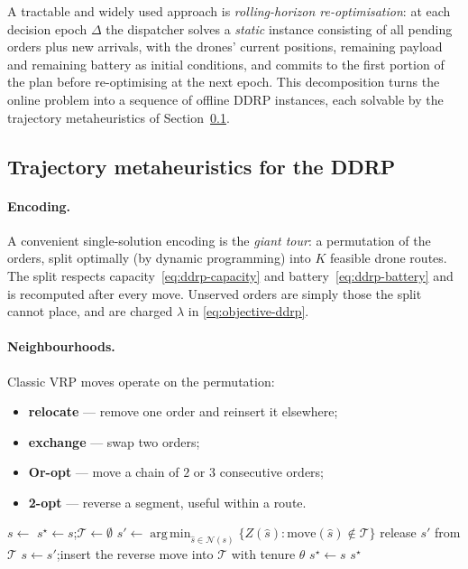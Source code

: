 \documentclass[11pt,a4paper]{article}
\DeclareMathOperator*{\argmin}{arg\,min}
\begin{document}
A tractable and widely used approach is \emph{rolling-horizon
re-optimisation}: at each decision epoch $\Delta$ the dispatcher solves a
\emph{static} instance consisting of all pending orders plus new arrivals, with
the drones' current positions, remaining payload and remaining battery as
initial conditions, and commits to the first portion of the plan before
re-optimising at the next epoch. This decomposition turns the online problem
into a sequence of offline DDRP instances, each solvable by the trajectory
metaheuristics of Section~\ref{sec:ddrp-meta}.

\subsection{Trajectory metaheuristics for the DDRP}
\label{sec:ddrp-meta}

\paragraph{Encoding.}
A convenient single-solution encoding is the \emph{giant tour}: a permutation
of the orders, split optimally (by dynamic programming) into $K$ feasible
drone routes. The split respects capacity~\eqref{eq:ddrp-capacity} and
battery~\eqref{eq:ddrp-battery} and is recomputed after every move. Unserved
orders are simply those the split cannot place, and are charged $\lambda$ in
\eqref{eq:objective-ddrp}.

\paragraph{Neighbourhoods.}
Classic VRP moves operate on the permutation:
\begin{itemize}
  \item \textbf{relocate} --- remove one order and reinsert it elsewhere;
  \item \textbf{exchange} --- swap two orders;
  \item \textbf{Or-opt} --- move a chain of $2$ or $3$ consecutive orders;
  \item \textbf{2-opt} --- reverse a segment, useful within a route.
\end{itemize}

\begin{algorithm}[H]
\caption{Tabu search for the (static) DDRP}
\label{alg:ts-ddrp}
\begin{algorithmic}[1]
\State $s \leftarrow$ 
\State $s^{\star} \leftarrow s$;\quad $\mathcal{T} \leftarrow \emptyset$
  \State $s' \leftarrow \argmin_{\hat{s}\in\mathcal{N}(s)} \{ Z(\hat{s}) : \text{move}(\hat{s}) \notin \mathcal{T} \}$
   
      \State release $s'$ from $\mathcal{T}$
  \EndIf
  \State $s \leftarrow s'$;\quad insert the reverse move into $\mathcal{T}$ with tenure $\theta$
      \State $s^{\star} \leftarrow s$
  \EndIf
\EndWhile
\State \Return $s^{\star}$
\end{algorithmic}
\end{algorithm}
\end{document}
